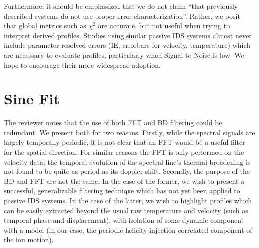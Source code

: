 \documentclass[]{AIAA}
\begin{document}
\hspace*{4ex}Furthermore, it should be emphasized that we do not claim ``that previously described systems do not use proper error-characterization''. Rather, we posit that global metrics such as $\chi^2$ are accurate, but not useful when trying to interpret derived profiles. Studies using similar passive IDS systems almost never include parameter resolved errors (IE, errorbars for velocity, temperature) which are necessary to evaluate profiles, particularly when Signal-to-Noise is low. We hope to encourage their more widespread adoption.


\section{Sine Fit}
\hspace{4ex}The reviewer notes that the use of both FFT and BD filtering could be redundant. We present both for two reasons. Firstly, while the spectral signals are largely temporally periodic, it is not clear that an FFT would be a useful filter for the spatial direction. For similar reasons the FFT is only performed on the velocity data; the temporal evolution of the spectral line's thermal broadening is not found to be quite as period as its doppler shift. Secondly, the purpose of the BD and FFT are not the same. In the case of the former, we wish to present a successful, generalizable filtering technique which has not yet been applied to passive IDS systems. In the case of the latter, we wish to highlight profiles which can be easily extracted beyond the usual raw temperature and velocity (such as temporal phase and displacement), with isolation of some dynamic component with a model (in our case, the periodic helicity-injection correlated component of the ion motion).
\end{document}
